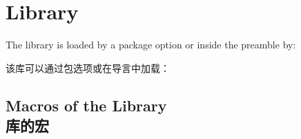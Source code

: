 \setcounter{section}{15}
\section{Library }\label{sec:raster}%
%
The library is loaded by a package option or inside the preamble by:

该库可以通过包选项或在导言中加载：
\begin{dispListing}
\end{dispListing}





\subsection{Macros of the Library\\库的宏}\label{subsec:raster_macros}

